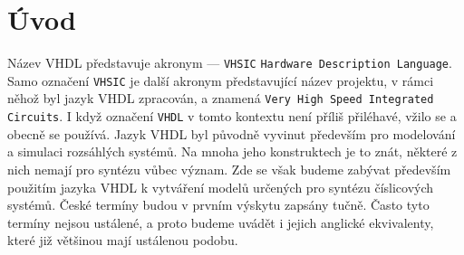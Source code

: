   \section{Úvod}
    Název VHDL představuje akronym — \texttt{VHSIC} \texttt{Hardware Des\-cription Language}. Samo 
    označení \texttt{VHSIC} je další akronym představující název projektu, v rámci něhož byl jazyk 
    VHDL zpracován, a znamená \texttt{Very High Speed Integrated Circuits}. I když označení 
    \texttt{VHDL} v tomto kontextu není příliš přiléhavé, vžilo se a obecně se používá. Jazyk VHDL 
    byl původně vyvinut především pro modelování a simulaci rozsáhlých systémů. Na mnoha jeho 
    konstruktech je to znát, některé z nich nemají pro syntézu vůbec význam. Zde se však budeme 
    zabývat především použitím jazyka VHDL k vytváření modelů určených pro syntézu číslicových 
    systémů. České termíny budou v prvním výskytu zapsány tučně. Často tyto termíny nejsou 
    ustálené, a proto budeme uvádět i jejich anglické ekvivalenty, které již většinou mají 
    ustálenou podobu.


